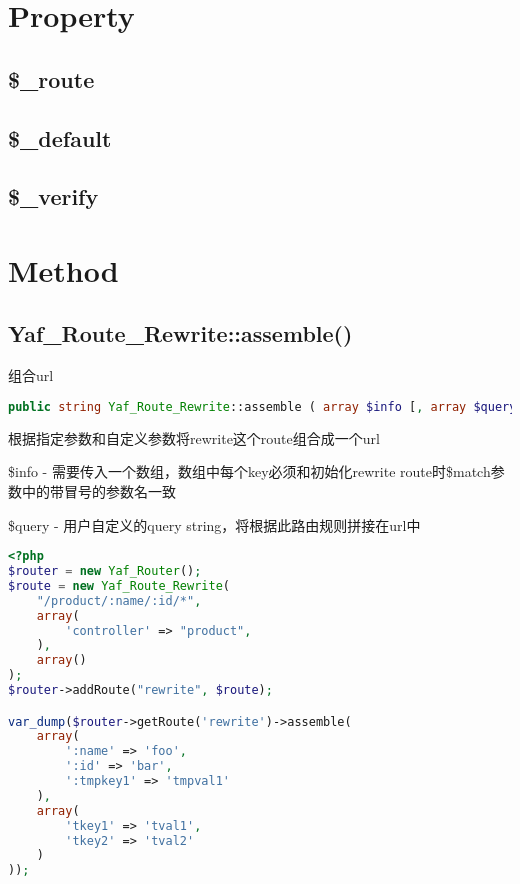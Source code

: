 \section{Property}


\subsection{\$\_route}


\subsection{\$\_default}


\subsection{\$\_verify}



\section{Method}


\subsection{Yaf\_Route\_Rewrite::assemble()}

组合url



\begin{lstlisting}[language=PHP]
public string Yaf_Route_Rewrite::assemble ( array $info [, array $query ] )
\end{lstlisting}

根据指定参数和自定义参数将rewrite这个route组合成一个url

\begin{compactitem}
\item \$info - 需要传入一个数组，数组中每个key必须和初始化rewrite route时\$match参数中的带冒号的参数名一致


\item \$query - 用户自定义的query string，将根据此路由规则拼接在url中

\end{compactitem}



\begin{lstlisting}[language=PHP]
<?php
$router = new Yaf_Router();
$route = new Yaf_Route_Rewrite(
    "/product/:name/:id/*",
    array(
        'controller' => "product",
    ),
    array()
);
$router->addRoute("rewrite", $route);

var_dump($router->getRoute('rewrite')->assemble(
    array(
        ':name' => 'foo',
        ':id' => 'bar',
        ':tmpkey1' => 'tmpval1'
    ),
    array(
        'tkey1' => 'tval1',
        'tkey2' => 'tval2'
    )
));
\end{lstlisting}

